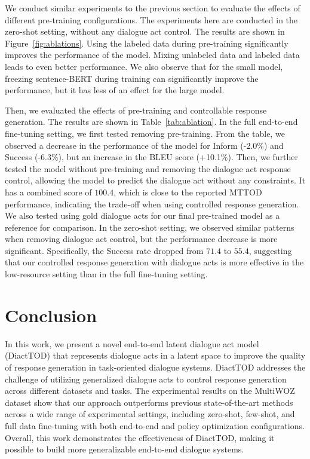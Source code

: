 We conduct similar experiments to the previous section to evaluate the effects of different pre-training configurations.
The experiments here are conducted in the zero-shot setting, without any dialogue act control.
The results are shown in Figure~\ref{fig:ablations}.
Using the labeled data during pre-training significantly improves the performance of the model.
Mixing unlabeled data and labeled data leads to even better performance.
We also observe that for the small model, freezing sentence-BERT during training can significantly improve the performance, but it has less of an effect for the large model.

Then, we evaluated the effects of pre-training and controllable response generation.
The results are shown in Table~\ref{tab:ablation}.
In the full end-to-end fine-tuning setting, we first tested removing pre-training.
From the table, we observed a decrease in the performance of the model for Inform (-2.0\%) and Success (-6.3\%), but an increase in the BLEU score (+10.1\%).
Then, we further tested the model without pre-training and removing the dialogue act response control, allowing the model to predict the dialogue act without any constraints.
It has a combined score of $100.4$, which is close to the reported MTTOD performance, indicating the trade-off when using controlled response generation.
We also tested using gold dialogue acts for our final pre-trained model as a reference for comparison.
In the zero-shot setting, we observed similar patterns when removing dialogue act control, but the performance decrease is more significant. Specifically, the Success rate dropped from $71.4$ to $55.4$, suggesting that our controlled response generation with dialogue acts is more effective in the low-resource setting than in the full fine-tuning setting.

\section{Conclusion}

In this work,  we present a novel end-to-end latent dialogue act model (DiactTOD) that represents dialogue acts in a latent space to improve the quality of response generation in task-oriented dialogue systems. 
DiactTOD addresses the challenge of utilizing generalized dialogue acts to control response generation across different datasets and tasks.
The experimental results on the MultiWOZ dataset show that our approach outperforms previous state-of-the-art methods across a wide range of experimental settings, including zero-shot, few-shot, and full data fine-tuning with both end-to-end and policy optimization configurations.  
Overall, this work demonstrates the effectiveness of DiactTOD, making it possible to build more generalizable end-to-end dialogue systems. 


